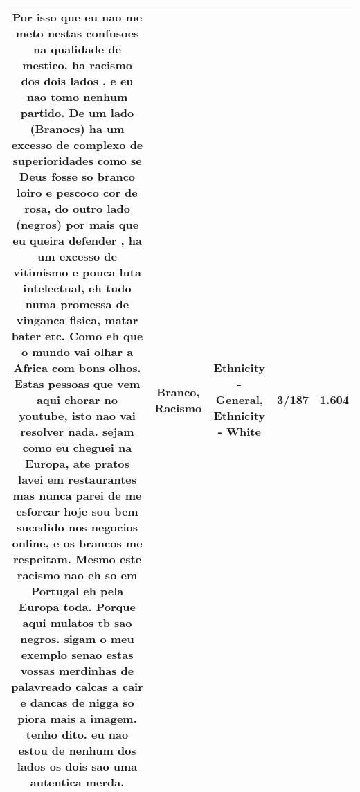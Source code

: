 \documentclass[11pt]{article}
\newlength\mylength
\begin{document}
\begin{center}
\begin{longtable}{|C{.65\mylength}|C{.30\mylength}|C{.12\mylength}|C{.12\mylength}|C{.12\mylength}|}
  \small Por isso que eu nao me meto nestas confusoes na qualidade de mestico.  ha \textbf{racismo} dos dois lados , e eu nao tomo nenhum partido. De um lado (Branocs) ha um excesso de complexo de superioridades como se Deus fosse  so \textbf{branco}  loiro e pescoco cor de rosa, do outro lado (negros) por mais que eu queira defender , ha um excesso de vitimismo e pouca luta intelectual, eh tudo numa promessa de vinganca fisica, matar bater etc.  Como eh que o mundo vai olhar a Africa com bons olhos. Estas pessoas que vem aqui chorar no youtube, isto nao vai resolver nada. sejam como eu cheguei na Europa, ate pratos lavei em restaurantes mas nunca parei de me esforcar hoje sou bem sucedido nos negocios  online, e os brancos me respeitam. Mesmo este \textbf{racismo} nao eh so em Portugal eh  pela Europa toda.  Porque aqui mulatos tb sao negros. sigam o meu exemplo senao estas vossas merdinhas de palavreado calcas a cair e dancas  de nigga  so piora mais a imagem. tenho dito. eu nao estou de nenhum dos lados os dois sao uma autentica merda.\normalsize   & Branco, Racismo & Ethnicity - General, Ethnicity - White & 3/187 & 1.604 \\  \hline

\end{longtable}
\end{center}
\end{document}
